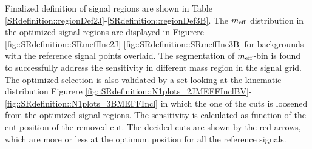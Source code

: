 Finalized definition of signal regions are shown in Table \ref{SRdefinition::regionDef2J}-\ref{SRdefinition::regionDef3B}. The $m_{\mathrm{eff}}$ distribution in the optimized signal regions are displayed in Figurere \ref{fig::SRdefinition::SRmeffInc2J}-\ref{fig::SRdefinition::SRmeffInc3B} for backgrounds with the reference signal points overlaid. The segmentation of $m_{\mathrm{eff}}$-bin is found to successfully address the sensitivity in different mass region in the signal grid. \\

The optimized selection is also validated by a set looking at the kinematic distribution Figurere \ref{fig::SRdefinition::N1plots_2JMEFFInclBV}-\ref{fig::SRdefinition::N1plots_3BMEFFIncl} in which the one of the cuts is loosened from the optimized signal regions. The sensitivity is calculated as function of the cut position of the removed cut. The decided cuts are shown by the red arrows, which are more or less at the optimum position for all the reference signals.





\clearpage				
